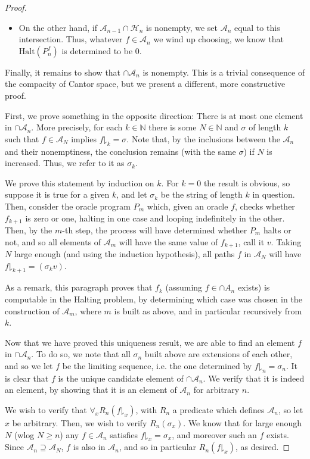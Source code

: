 \documentclass{article}
\theoremstyle{nonumberplain}
\newtheorem{proof}{Proof}
\newcommand{\N}{\mathbb{N}}
\newcommand{\halt}{\mathrm{Halt}}
\newcommand{\cl}[1]{\mathcal{#1}}
\newcommand{\take}[2]{#1\mathord{\downharpoonright}_{#2}}
\begin{document}
\begin{proof}
\begin{itemize}
\item On the other hand, if $\cl A_{n-1} \cap \cl H_n$ is nonempty, we set $\cl A_n$ equal to this intersection. Thus, whatever $f \in \cl A_n$ we wind up choosing, we know that $\halt(P_n^f)$ is determined to be $0$.
\end{itemize}

Finally, it remains to show that $\cap \cl A_n$ is nonempty. This is a trivial consequence of the compacity of Cantor space, but we present a different, more constructive proof.

First, we prove something in the opposite direction: There is at most one element in $\cap \cl A_n$. More precisely, for each $k \in \N$ there is some $N \in \N$ and $\sigma$ of length $k$ such that $f \in \cl A_N$ implies $\take f k = \sigma$. Note that, by the inclusions between the $\cl A_n$ and their nonemptiness, the conclusion remains (with the same $\sigma$) if $N$ is increased. Thus, we refer to it as $\sigma_k$.

We prove this statement by induction on $k$. For $k = 0$ the result is obvious, so suppose it is true for a given $k$, and let $\sigma_k$ be the string of length $k$ in question. Then, consider the oracle program $P_m$ which, given an oracle $f$, checks whether $f_{k+1}$ is zero or one, halting in one case and looping indefinitely in the other. Then, by the $m$-th step, the process will have determined whether $P_m$ halts or not, and so all elements of $\cl A_m$ will have the same value of $f_{k+1}$, call it $v$. Taking $N$ large enough (and using the induction hypothesis), all paths $f$ in $\cl A_N$ will have $\take f {k+1} = (\sigma_k v)$.

As a remark, this paragraph proves that $f_k$ (assuming $f \in \cap A_n$ exists) is computable in the Halting problem, by determining which case was chosen in the construction of $\cl A_m$, where $m$ is built as above, and in particular recursively from $k$.

Now that we have proved this uniqueness result, we are able to find an element $f$ in $\cap \cl A_n$. To do so, we note that all $\sigma_n$ built above are extensions of each other, and so we let $f$ be the limiting sequence, i.e. the one determined by $\take f n = \sigma_n$. It is clear that $f$ is the unique candidate element of $\cap \cl A_n$. We verify that it is indeed an element, by showing that it is an element of $\cl A_n$ for arbitrary $n$.

We wish to verify that $\forall_x R_n(\take f x)$, with $R_n$ a predicate which defines $\cl A_n$, so let $x$ be arbitrary. Then, we wish to verify $R_n(\sigma_x)$. We know that for large enough $N$ (wlog $N \geq n$) any $f \in \cl A_n$ satisfies $\take f x = \sigma_x$, and moreover such an $f$ exists. Since $\cl A_n \supseteq \cl A_N$, $f$ is also in $\cl A_n$, and so in particular $R_n(\take f x)$, as desired.
\end{proof}



\end{document}
